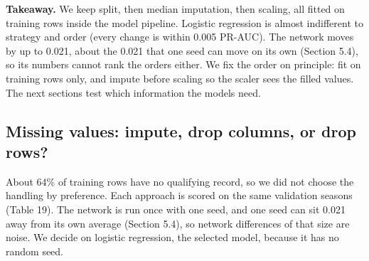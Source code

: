 \documentclass[10pt,a4paper]{article}
\begin{document}
\begin{takeaway}
\textbf{Takeaway.} We keep split, then median imputation, then scaling, all fitted on training rows inside the model pipeline. Logistic regression is almost indifferent to strategy and order (every change is within 0.005 PR-AUC). The network moves by up to 0.021, about the 0.021 that one seed can move on its own (Section 5.4), so its numbers cannot rank the orders either. We fix the order on principle: fit on training rows only, and impute before scaling so the scaler sees the filled values. The next sections test which information the models need.
\end{takeaway}



\subsection{Missing values: impute, drop columns, or drop rows?}


About 64\% of training rows have no qualifying record, so we did not choose the handling by preference. Each approach is scored on the same validation seasons (Table 19). The network is run once with one seed, and one seed can sit 0.021 away from its own average (Section 5.4), so network differences of that size are noise. We decide on logistic regression, the selected model, because it has no random seed.
\end{document}

